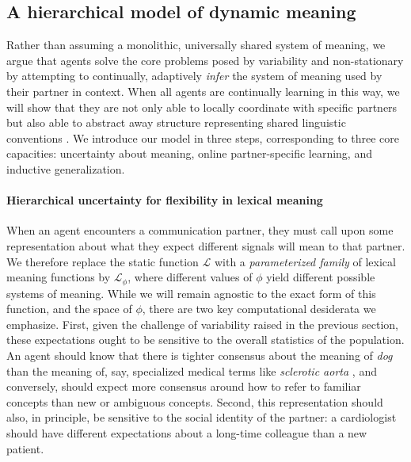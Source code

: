 \subsection{A hierarchical model of dynamic meaning}

Rather than assuming a monolithic, universally shared system of meaning, we argue that agents solve the core problems posed by variability and non-stationary by attempting to continually, adaptively \emph{infer} the system of meaning used by their partner in context.
When all agents are continually learning in this way, we will show that they are not only able to locally coordinate with specific partners but also able to abstract away structure representing shared linguistic conventions .
We introduce our model in three steps, corresponding to three core capacities: uncertainty about meaning, online partner-specific learning, and inductive generalization.

\paragraph{Hierarchical uncertainty for flexibility in lexical meaning} 

When an agent encounters a communication partner, they must call upon some representation about what they expect different signals will mean to that partner. 
We therefore replace the static function $\mathcal{L}$ with a \emph{parameterized family} of lexical meaning functions by $\mathcal{L}_{\phi}$, where different values of $\phi$ yield different possible systems of meaning. 
While we will remain agnostic to the exact form of this function, and the space of $\phi$, there are two key computational desiderata we emphasize.
First, given the challenge of variability raised in the previous section, these expectations ought to be sensitive to the overall statistics of the population. 
An agent should know that there is tighter consensus about the meaning of \emph{dog} than the meaning of, say, specialized medical terms like \emph{sclerotic aorta} \cite{Clark98_CommunalLexicons}, and conversely, should expect more consensus around how to refer to familiar concepts than new or ambiguous concepts.
Second, this representation should also, in principle, be sensitive to the social identity of the partner: a cardiologist should have different expectations about a long-time colleague than a new patient.

